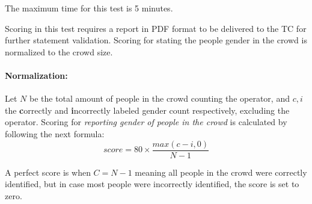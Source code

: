The maximum time for this test is 5 minutes.

Scoring in this test requires a report in PDF format to be delivered to the TC for further statement validation. Scoring for stating the people gender in the crowd is normalized to the crowd size. 

\begin{scorelist}

\end{scorelist}

\paragraph{Normalization:}
Let $N$ be the total amount of people in the crowd counting the operator, and $c, i$  the \textbf{c}orrectly and \textbf{i}ncorrectly labeled gender count respectively, excluding the operator. Scoring for \textit{reporting gender of people in the crowd} is calculated by following the next formula:
$$score = 80 \times \frac{max(c - i, 0)}{N-1}$$

A perfect score is when $C = N-1$ meaning all people in the crowd were correctly identified, but in case most people were incorrectly identified, the score is set to zero.

\vspace*{\fill}~

